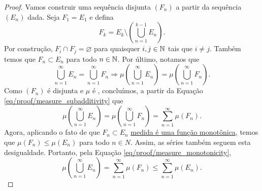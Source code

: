 \begin{proof}
    Vamos construir uma sequência disjunta $(F_n)$ a partir da sequência $(E_n)$ dada. Seja $F_1=E_1$ e defina
    \begin{equation*}
        F_k = E_k \setminus \left(\bigcup_{n=1}^{k-1} E_n\right).
    \end{equation*}
    Por construção, $F_i \cap F_j =\varnothing$ para quaisquer $i,j\in \mathbb{N}$ tais que $i\neq j$. Também temos que $F_n \subset E_n$ para todo $n\in \mathbb{N}$. Por último, notamos que
    \begin{equation}\label{eq/proof/measure_subadditivity}
        \bigcup_{n=1}^{\infty} E_n = \bigcup_{n=1}^{\infty} F_n \Longrightarrow \mu \left(\bigcup_{n=1}^{\infty} E_n\right) = \mu \left(\bigcup_{n=1}^{\infty} F_n\right).
    \end{equation}
    Como $(F_n)$ é disjunta e $\mu$ é , concluímos, a partir da Equação \eqref{eq/proof/measure_subadditivity} que
    \begin{equation}\label{eq/proof/measure_monotonicity}
        \mu \left(\bigcup_{n=1}^{\infty} E_n\right) = \mu \left(\bigcup_{n=1}^{\infty} F_n\right) = \sum_{n=1}^{\infty} \mu (F_n).
    \end{equation}
    Agora, aplicando o fato de que $F_n\subset E_n$ \hyperref[prop:measure_is_monotonic]{medida é uma função monotônica}, temos que $\mu(F_n) \leq \mu(E_n)$ para todo $n\in N$. Assim, as séries também seguem esta desigualdade. Portanto, pela Equação \eqref{eq/proof/measure_monotonicity},
    \begin{equation*}
        \mu \left(\bigcup_{n=1}^{\infty} E_n\right) = \sum_{n=1}^{\infty} \mu (F_n)\leq \sum_{n=1}^{\infty} \mu (E_n).
    \end{equation*}
\end{proof}